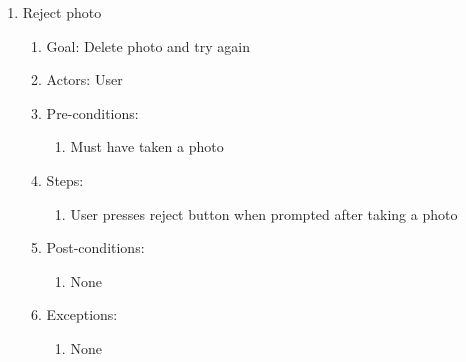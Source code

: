 \begin{enumerate}
    \item Reject photo
    \begin{enumerate}
        \item Goal: Delete photo and try again
        \item Actors: User
        \item Pre-conditions:
            \begin{enumerate}
                \item Must have taken a photo
            \end{enumerate}
        \item Steps:
            \begin{enumerate}
                \item User presses reject button when prompted after taking a photo
            \end{enumerate}
        \item Post-conditions:
            \begin{enumerate}
                \item None
            \end{enumerate}
        \item Exceptions:
            \begin{enumerate}
                \item None
            \end{enumerate}
    \end{enumerate}
\end{enumerate}

